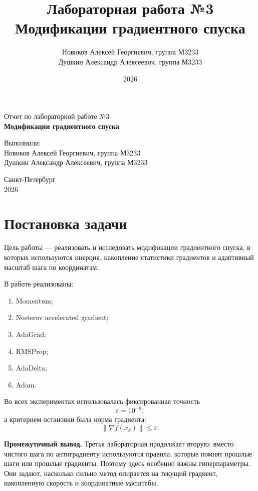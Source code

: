 ﻿\documentclass[14pt,a4paper]{extarticle}
\title{Лабораторная работа №3\\Модификации градиентного спуска}
\author{
    Новиков Алексей Георгиевич, группа М3233\\
    Душкин Александр Алексеевич, группа М3233
}
\date{2026}
\begin{document}
\hypersetup{pageanchor=false}
\begin{titlepage}
    \begin{center}
        {\large Отчет по лабораторной работе №3}\\[0.5cm]
        {\LARGE \textbf{Модификации градиентного спуска}}\\[2cm]

        \begin{flushright}
            Выполнили:\\[0.2cm]
            Новиков Алексей Георгиевич, группа М3233\\
            Душкин Александр Алексеевич, группа М3233\\[0.5cm]
        \end{flushright}

        \vfill
        Санкт-Петербург\\[0.2cm]
        2026
    \end{center}
\end{titlepage}
\hypersetup{pageanchor=true}

\tableofcontents
\newpage

\section{Постановка задачи}

Цель работы --- реализовать и исследовать модификации градиентного спуска, в которых используются инерция, накопление статистики градиентов и адаптивный масштаб шага по координатам.

В работе реализованы:
\begin{enumerate}
    \item Momentum;
    \item Nesterov accelerated gradient;
    \item AdaGrad;
    \item RMSProp;
    \item AdaDelta;
    \item Adam.
\end{enumerate}

Во всех экспериментах использовалась фиксированная точность
\[
    \varepsilon = 10^{-8},
\]
а критерием остановки была норма градиента:
\[
    \|\nabla f(x_k)\|\le \varepsilon.
\]

\textbf{Промежуточный вывод.} Третья лабораторная продолжает вторую: вместо чистого шага по антиградиенту используются правила, которые помнят прошлые шаги или прошлые градиенты. Поэтому здесь особенно важны гиперпараметры. Они задают, насколько сильно метод опирается на текущий градиент, накопленную скорость и координатные масштабы.
\end{document}
